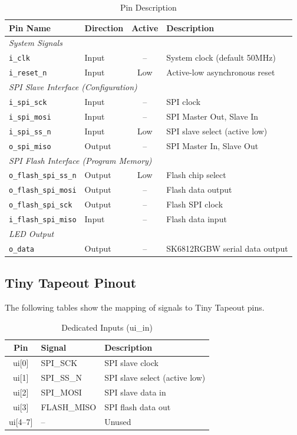 \documentclass[11pt,a4paper]{article}
\begin{document}
\begin{table}[H]
\centering
\caption{Pin Description}
\begin{tabular}{@{}llcp{6cm}@{}}
\toprule
\textbf{Pin Name} & \textbf{Direction} & \textbf{Active} & \textbf{Description} \\
\midrule
\multicolumn{4}{l}{\textit{System Signals}} \\
\texttt{i\_clk} & Input & -- & System clock (default 50MHz) \\
\texttt{i\_reset\_n} & Input & Low & Active-low asynchronous reset \\
\midrule
\multicolumn{4}{l}{\textit{SPI Slave Interface (Configuration)}} \\
\texttt{i\_spi\_sck} & Input & -- & SPI clock \\
\texttt{i\_spi\_mosi} & Input & -- & SPI Master Out, Slave In \\
\texttt{i\_spi\_ss\_n} & Input & Low & SPI slave select (active low) \\
\texttt{o\_spi\_miso} & Output & -- & SPI Master In, Slave Out \\
\midrule
\multicolumn{4}{l}{\textit{SPI Flash Interface (Program Memory)}} \\
\texttt{o\_flash\_spi\_ss\_n} & Output & Low & Flash chip select \\
\texttt{o\_flash\_spi\_mosi} & Output & -- & Flash data output \\
\texttt{o\_flash\_spi\_sck} & Output & -- & Flash SPI clock \\
\texttt{i\_flash\_spi\_miso} & Input & -- & Flash data input \\
\midrule
\multicolumn{4}{l}{\textit{LED Output}} \\
\texttt{o\_data} & Output & -- & SK6812RGBW serial data output \\
\bottomrule
\end{tabular}
\end{table}

\subsection{Tiny Tapeout Pinout}

The following tables show the mapping of signals to Tiny Tapeout pins.

\begin{table}[H]
\centering
\caption{Dedicated Inputs (ui\_in)}
\begin{tabular}{@{}clp{6cm}@{}}
\toprule
\textbf{Pin} & \textbf{Signal} & \textbf{Description} \\
\midrule
ui[0] & SPI\_SCK & SPI slave clock \\
ui[1] & SPI\_SS\_N & SPI slave select (active low) \\
ui[2] & SPI\_MOSI & SPI slave data in \\
ui[3] & FLASH\_MISO & SPI flash data out \\
ui[4--7] & -- & Unused \\
\bottomrule
\end{tabular}
\end{table}
\end{document}
